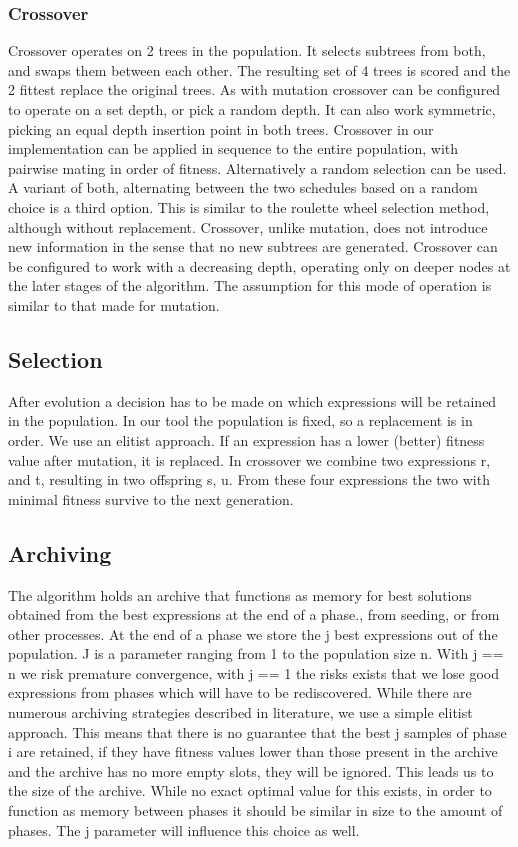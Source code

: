 \subsubsection{Crossover}
Crossover operates on 2 trees in the population. It selects subtrees from both, and swaps them between each other. The resulting set of 4 trees is scored and the 2 fittest replace the original trees. As with mutation crossover can be configured to operate on a set depth, or pick a random depth. It can also work symmetric, picking an equal depth insertion point in both trees.
Crossover in our implementation can be applied in sequence to the entire population, with pairwise mating in order of fitness. Alternatively a random selection can be used. A variant of both, alternating between the two schedules based on a random choice is a third option. This is similar to the roulette wheel selection method, although without replacement. 
Crossover, unlike mutation, does not introduce new information in the sense that no new subtrees are generated. 
Crossover can be configured to work with a decreasing depth, operating only on deeper nodes at the later stages of the algorithm. The assumption for this mode of operation is similar to that made for mutation. 

\subsection{Selection}
After evolution a decision has to be made on which expressions will be retained in the population. In our tool the population is fixed, so a replacement is in order. We use an elitist approach. If an expression has a lower (better) fitness value after mutation, it is replaced. 
In crossover we combine two expressions r, and t, resulting in two offspring s, u. 
From these four expressions the two with minimal fitness survive to the next generation.

\subsection{Archiving}
The algorithm holds an archive that functions as memory for best solutions obtained from the best expressions at the end of a phase., from seeding, or from other processes. 
At the end of a phase we store the j best expressions out of the population. J is a parameter ranging from 1 to the population size n. With j == n we risk premature convergence, with j == 1 the risks exists that we lose good expressions from phases which will have to be rediscovered. 
While there are numerous archiving strategies described in literature, we use a simple elitist approach. This means that there is no guarantee that the best j samples of phase i are retained, if they have fitness values lower than those present in the archive and the archive has no more empty slots, they will be ignored.
This leads us to the size of the archive. While no exact optimal value for this exists, in order to function as memory between phases it should be similar in size to the amount of phases. The j parameter will influence this choice as well.

